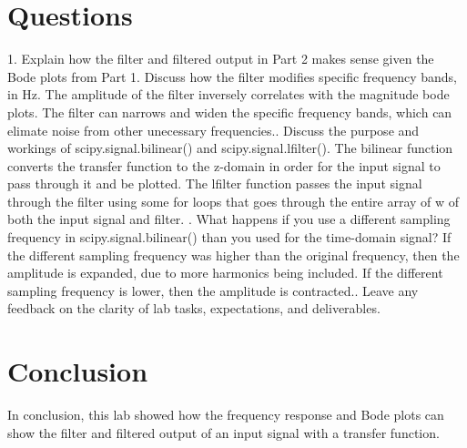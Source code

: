 \documentclass[12pt]{article}
\begin{document}
\section{Questions}
1. Explain how the filter and filtered output in Part 2 makes sense given the Bode plots from Part 1. Discuss how the filter modifies specific frequency bands, in Hz.\newline
The amplitude of the filter inversely correlates with the magnitude bode plots. The filter can narrows and widen the specific frequency bands, which can elimate noise from other unecessary frequencies.. Discuss the purpose and workings of scipy.signal.bilinear() and scipy.signal.lfilter().\newline
The bilinear function converts the transfer function to the z-domain in order for the input signal to pass through it and be plotted.\newline
The lfilter function passes the input signal through the filter using some for loops that goes through the entire array of w of both the input signal and filter. . What happens if you use a different sampling frequency in scipy.signal.bilinear() than you used for the time-domain signal?\newline
If the different sampling frequency was higher than the original frequency, then the amplitude is expanded, due to more harmonics being included. If the different sampling frequency is lower, then the amplitude is contracted.. Leave any feedback on the clarity of lab tasks, expectations, and deliverables.\newline


\section{Conclusion}
In conclusion, this lab showed how the frequency response and Bode plots can show the filter and filtered output of an input signal with a transfer function.
\end{document}
